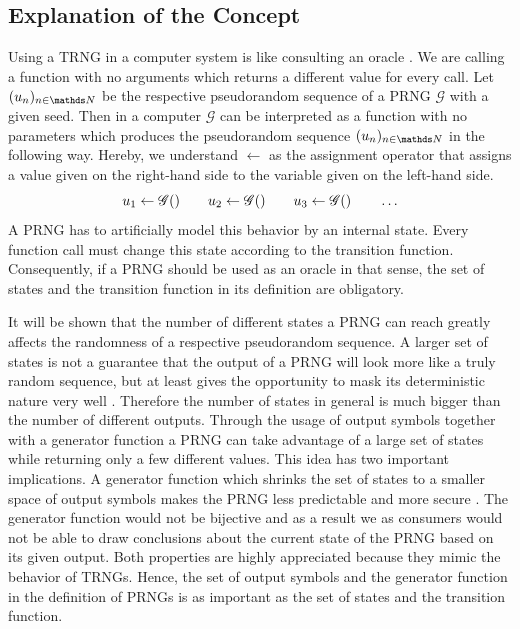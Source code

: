 \documentclass{stdlocal}
\begin{document}
  \subsection{Explanation of the Concept}
  Using a TRNG in a computer system is like consulting an oracle \autocite{mueller2012}.
  We are calling a function with no arguments which returns a different value for every call.
  Let $(u_n)_{n\in\setNatural}$ be the respective pseudorandom sequence of a PRNG $\mathscr{G}$ with a given seed.
  Then in a computer $\mathscr{G}$ can be interpreted as a function with no parameters which produces the pseudorandom sequence $(u_n)_{n\in\setNatural}$ in the following way.
  Hereby, we understand $\leftarrow$ as the assignment operator that assigns a value given on the right-hand side to the variable given on the left-hand side.
  \[
    u_1 \leftarrow \mathscr{G}()
    \qquad
    u_2 \leftarrow \mathscr{G}()
    \qquad
    u_3 \leftarrow \mathscr{G}()
    \qquad
    \ldots
  \]
  A PRNG has to artificially model this behavior by an internal state.
  Every function call must change this state according to the transition function.
  Consequently, if a PRNG should be used as an oracle in that sense, the set of states and the transition function in its definition are obligatory.

  It will be shown that the number of different states a PRNG can reach greatly affects the randomness of a respective pseudorandom sequence.
  A larger set of states is not a guarantee that the output of a PRNG will look more like a truly random sequence, but at least gives the opportunity to mask its deterministic nature very well \autocite{oneill2014}.
  Therefore the number of states in general is much bigger than the number of different outputs.
  Through the usage of output symbols together with a generator function a PRNG can take advantage of a large set of states while returning only a few different values.
  This idea has two important implications.
  A generator function which shrinks the set of states to a smaller space of output symbols makes the PRNG less predictable and more secure \autocite{oneill2014}.
  The generator function would not be bijective and as a result we as consumers would not be able to draw conclusions about the current state of the PRNG based on its given output.
  Both properties are highly appreciated because they mimic the behavior of TRNGs.
  Hence, the set of output symbols and the generator function in the definition of PRNGs is as important as the set of states and the transition function.
\end{document}
